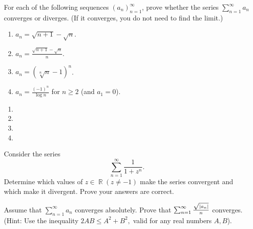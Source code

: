 \documentclass[12pt,letterpaper,boxed]{hmcpset}
\DeclareMathOperator{\R}{\mathbb{R}}
\DeclarePairedDelimiter\abs{\lvert}{\rvert}%
\begin{document}

\begin{problem}[Exercise 2.16]
For each of the following sequences $(a_n)_{n = 1}^{\infty}$, prove whether the series $\sum_{n =1}^{\infty}a_n$ converges or diverges. (If it converges, you do not need to find the limit.)
\begin{enumerate}
    \item $a_n = \sqrt{n + 1} - \sqrt{n}$.
    \item $a_n = \frac{\sqrt{n + 1} - \sqrt{n}}{n}$.
    \item $a_n = (\sqrt[n]{n} - 1)^{n}$.
    \item $a_n = \frac{(-1)^{n}}{\log{n}}$ for $n \ge 2$ (and $a_1 = 0$).
\end{enumerate}
\end{problem}

\begin{solution}
\begin{enumerate}
    \item 
    \item 
    \item 
    \item 
\end{enumerate}
\end{solution}

\begin{problem}[Exercise 2.17]
Consider the series $$\sum_{n=1}^{\infty} \frac{1}{1 + z^{n}}.$$ Determine which values of $z\in\R (z \neq -1)$ make the series convergent and which make it divergent. Prove your answers are correct.
\end{problem}

\begin{solution}

\end{solution}


\begin{problem}[Exercise 3.6]
Assume that $\sum_{n = 1}^{\infty} a_n$ converges absolutely. Prove that $\sum_{n =1}^{\infty} \frac{\sqrt{\abs{a_n}}}{n}$ converges. (Hint: Use the inequality $2AB \leq A^{2} + B^{2},$ valid for any real numbers $A, B$).
\end{problem}


\begin{solution}

\end{solution}
\end{document}
